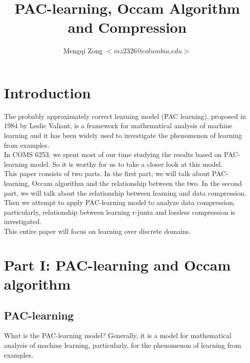 \documentclass[12pt]{article}
\title{PAC-learning, Occam Algorithm and Compression}
\author{Mengqi Zong $<mz2326@columbia.edu>$}
\begin{document}
\maketitle

\setlength{\parindent}{0in}

\thispagestyle{plain}

\section{Introduction}


The probably approximately correct learning model (PAC learning), proposed in 1984 by Leslie Valiant, is a framework for mathematical analysis of machine learning and it has been widely used to investigate the phenomenon of learning from examples. \\

In COMS 6253, we spent most of our time studying the results based on PAC-learning model. So it is worthy for us to take a closer look at this model. \\

This paper consists of two parts. In the first part, we will talk about PAC-learning, Occam algorithm and the relationship between the two. In the second part, we will talk about the relationship between learning and data compression. Then we attempt to apply PAC-learning model to analyze data compression, particularly, relationship between learning r-junta and lossless compression is investigated. \\

This entire paper will focus on learning over discrete domains. 


\section{Part I: PAC-learning and Occam algorithm}

\subsection{PAC-learning}


What is the PAC-learning model? Generally, it is a model for mathematical analysis of machine learning, particularly, for the phenomenon of learning from examples. \\
\end{document}
